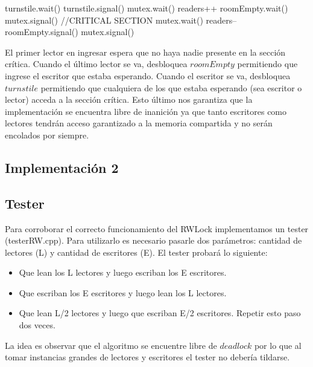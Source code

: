 \begin{algorithmic}
	\State turnstile.wait()
	\State turnstile.signal()
	\State mutex.wait()
	\State readers++
		\State roomEmpty.wait()
	\EndIf
	\State mutex.signal()
	\State //CRITICAL SECTION
	\State mutex.wait()
	\State readers--
		\State roomEmpty.signal()
	\EndIf
	\State mutex.signal()
  \EndFunction
\end{algorithmic}

El primer lector en ingresar espera que no haya nadie presente en la sección crítica. Cuando el último lector se va, desbloquea $roomEmpty$ permitiendo que ingrese el escritor que estaba esperando. Cuando el escritor se va, desbloquea $turnstile$ permitiendo que cualquiera de los que estaba esperando (sea escritor o lector) acceda a la sección crítica. Esto último nos garantiza que la implementación se encuentra libre de inanición ya que tanto escritores como lectores tendrán acceso garantizado a la memoria compartida y no serán encolados por siempre.

\subsection{Implementación 2}

\subsection{Tester}

Para corroborar el correcto funcionamiento del RWLock implementamos un tester (testerRW.cpp). Para utilizarlo es necesario pasarle dos parámetros: cantidad de lectores (L) y cantidad de escritores (E). El tester probará lo siguiente:

\begin{itemize}
	\item Que lean los L lectores y luego escriban los E escritores.
	\item Que escriban los E escritores y luego lean los L lectores.
	\item Que lean L/2 lectores y luego que escriban E/2 escritores. Repetir esto paso dos veces.
\end{itemize}

La idea es observar que el algoritmo se encuentre libre de $deadlock$ por lo que al tomar instancias grandes de lectores y escritores el tester no debería tildarse.




